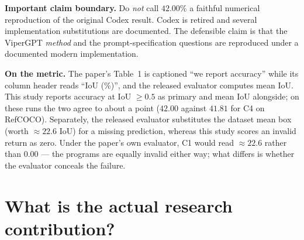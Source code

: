 \documentclass[11pt,a4paper]{article}
\begin{document}
\begin{caution}
\textbf{Important claim boundary.} Do \emph{not} call $42.00\%$ a faithful numerical
reproduction of the original Codex result. Codex is retired and several implementation
substitutions are documented. The defensible claim is that the ViperGPT \emph{method}
and the prompt-specification questions are reproduced under a documented modern
implementation.
\end{caution}

\begin{callout}
\textbf{On the metric.} The paper's Table~1 is captioned ``we report accuracy'' while
its column header reads ``IoU (\%)'', and the released evaluator computes mean IoU.
This study reports accuracy at IoU $\geq 0.5$ as primary and mean IoU alongside; on
these runs the two agree to about a point ($42.00$ against $41.81$ for C4 on RefCOCO).
Separately, the released evaluator substitutes the dataset mean box (worth $\approx
22.6$ IoU) for a missing prediction, whereas this study scores an invalid return as
zero. Under the paper's own evaluator, C1 would read $\approx 22.6$ rather than $0.00$
--- the programs are equally invalid either way; what differs is whether the evaluator
conceals the failure.
\end{callout}

\section{What is the actual research contribution?}
\end{document}
